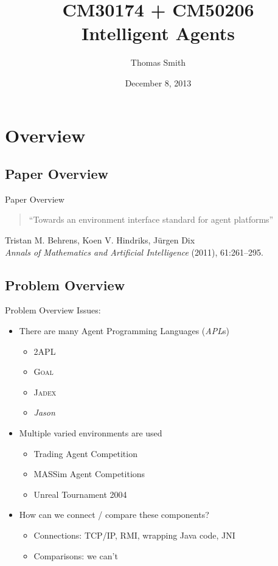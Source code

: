 \documentclass[t]{beamer}
\author[TAES]{Thomas Smith}
\title[CM30174/CM50206]{CM30174 + CM50206\\Intelligent Agents}
\institute[Bath/CS]{East Building}
\date{December 8, 2013}
\begin{document}
\begin{frame}
  \titlepage
\end{frame}

\section{Overview}
\subsection{Paper Overview}
\begin{frame}[c]{Paper Overview}
	\begin{quote}
		``Towards an environment interface standard for agent platforms''
	\end{quote}
	\hfill Tristan M. Behrens, Koen V. Hindriks, J{\"u}rgen Dix\\
	\hfill {\tiny \textit{Annals of Mathematics and Artificial Intelligence} (2011), 61:261--295.}
\end{frame}
\subsection{Problem Overview}
\begin{frame}{Problem Overview}
	Issues:
	\pause
	\begin{itemize}[<+->]
		\item There are many Agent Programming Languages (\emph{APL}s)
		\begin{itemize}
			\item<3-> 2APL
			\item<3-> \textsc{Goal}
			\item<3-> \textsc{Jadex}
			\item<3-> \textit{Jason}
		\end{itemize}
		\pause
		\item Multiple varied environments are used
		\begin{itemize}
			\item<5-> Trading Agent Competition
			\item<5-> MASSim Agent Competitions
			\item<5-> Unreal Tournament 2004
		\end{itemize}
		\pause
		\item How can we connect / compare these components?
		\begin{itemize}
			\item Connections: TCP/IP, RMI, wrapping Java code, JNI
			\item Comparisons: we can't
		\end{itemize}
	\end{itemize}
\end{frame}
\end{document}
